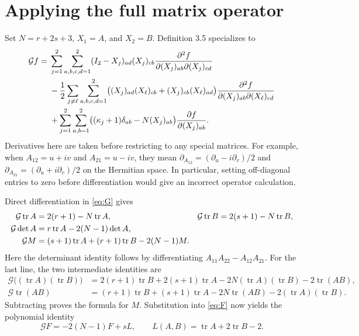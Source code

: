 \documentclass[11pt]{article}
\newcommand{\tr}{\operatorname{tr}}
\newcommand{\G}{\mathcal G}
\begin{document}
\section*{Applying the full matrix operator}
Set $N=r+2s+3$, $X_1=A$, and $X_2=B$. Definition 3.5 specializes to
\begin{align}
 \G f={}&\sum_{j=1}^2\sum_{a,b,c,d=1}^2
 (I_2-X_j)_{ad}(X_j)_{cb}
 \frac{\partial^2f}{\partial(X_j)_{ab}\partial(X_j)_{cd}}\notag\\
 &-\frac12\sum_{j\ne\ell}\sum_{a,b,c,d=1}^2
 \bigl((X_j)_{ad}(X_\ell)_{cb}+(X_j)_{cb}(X_\ell)_{ad}\bigr)
 \frac{\partial^2f}{\partial(X_j)_{ab}\partial(X_\ell)_{cd}}\label{eq:G}\\
 &+\sum_{j=1}^2\sum_{a,b=1}^2
 \bigl((\kappa_j+1)\delta_{ab}-N(X_j)_{ab}\bigr)
 \frac{\partial f}{\partial(X_j)_{ab}}.\notag
\end{align}
Derivatives here are taken before restricting to any special matrices.
For example, when $A_{12}=u+iv$ and $A_{21}=u-iv$, they mean
$\partial_{A_{12}}=(\partial_u-i\partial_v)/2$ and
$\partial_{A_{21}}=(\partial_u+i\partial_v)/2$ on the Hermitian space.
In particular, setting off-diagonal entries to zero before differentiation
would give an incorrect operator calculation.

Direct differentiation in \eqref{eq:G} gives
\begin{align}
 \G\tr A&=2(r+1)-N\tr A,&
 \G\tr B&=2(s+1)-N\tr B,\label{eq:table}\\
 \G\det A&=r\tr A-2(N-1)\det A,\notag\\
 \G M&=(s+1)\tr A+(r+1)\tr B-2(N-1)M.\notag
\end{align}
Here the determinant identity follows by differentiating
$A_{11}A_{22}-A_{12}A_{21}$. For the last line, the two intermediate
identities are
\begin{align*}
 \G\bigl((\tr A)(\tr B)\bigr)
 &=2(r+1)\tr B+2(s+1)\tr A
   -2N(\tr A)(\tr B)-2\tr(AB),\\
 \G\tr(AB)
 &=(r+1)\tr B+(s+1)\tr A
   -2N\tr(AB)-2(\tr A)(\tr B).
\end{align*}
Subtracting proves the formula for $M$. Substitution into \eqref{eq:F}
now yields the polynomial identity
\begin{equation}\label{eq:residual}
 \boxed{\ \G F=-2(N-1)F+sL,\qquad
 L(A,B)=\tr A+2\tr B-2.\ }
\end{equation}
\end{document}
